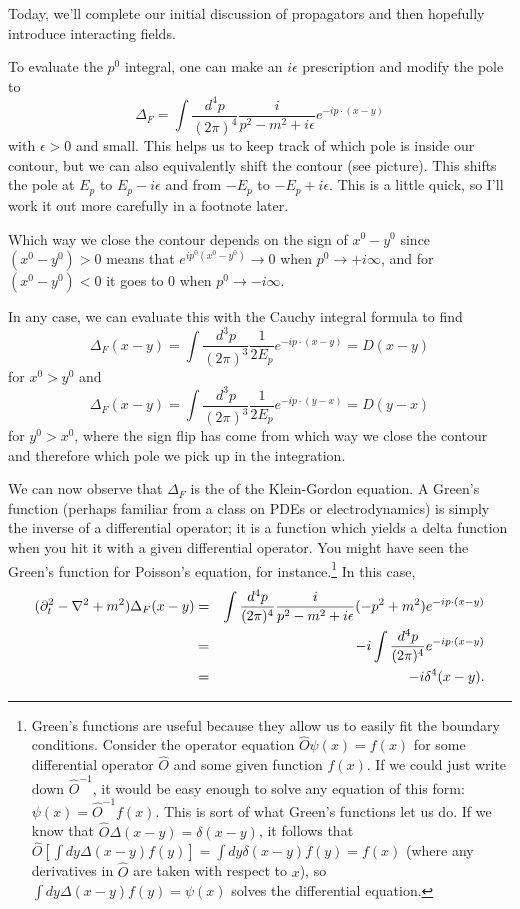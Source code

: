 Today, we'll complete our initial discussion of propagators and then hopefully introduce interacting fields.

To evaluate the $p^0$ integral, one can make an $i\epsilon$ prescription and modify the pole to
$$\Delta_F=\int \frac{d^4p}{(2\pi)^4}\frac{i}{p^2-m^2+i\epsilon}e^{-ip\cdot (x-y)}$$
with $\epsilon>0$ and small. This helps us to keep track of which pole is inside our contour, but we can also equivalently shift the contour (see picture). This shifts the pole at $E_p$ to $E_p-i\epsilon$ and from $-E_p$ to $-E_p+i\epsilon$. This is a little quick, so I'll work it out more carefully in a footnote later.

Which way we close the contour depends on the sign of $x^0-y^0$ since $(x^0-y^0)>0$ means that $e^{ip^0 (x^0-y^0)}\to 0$ when $p^0\to +i\infty$, and for $(x^0-y^0)<0$ it goes to $0$ when $p^0\to -i\infty$.

In any case, we can evaluate this with the Cauchy integral formula to find
$$\Delta_F(x-y)=\int \frac{d^3p}{(2\pi)^3}\frac{1}{2E_p}e^{-ip\cdot (x-y)}=D(x-y)$$
for $x^0>y^0$ and 
$$\Delta_F(x-y)=\int \frac{d^3p}{(2\pi)^3}\frac{1}{2E_p}e^{-ip\cdot (y-x)}=D(y-x)$$ for $y^0>x^0$, where the sign flip has come from which way we close the contour and therefore which pole we pick up in the integration.

We can now observe that $\Delta_F$ is the  of the Klein-Gordon equation. A Green's function (perhaps familiar from a class on PDEs or electrodynamics) is simply the inverse of a differential operator; it is a function which yields a delta function when you hit it with a given differential operator. You might have seen the Green's function for Poisson's equation, for instance.\footnote{Green's functions are useful because they allow us to easily fit the boundary conditions. Consider the operator equation $\hat O \psi(x) = f(x)$ for some differential operator $\hat O$ and some given function $f(x)$. If we could just write down $\hat O^{-1}$, it would be easy enough to solve any equation of this form: $\psi(x)=\hat O^{-1} f(x)$. This is sort of what Green's functions let us do. If we know that $\hat O \Delta(x-y) = \delta(x-y)$, it follows that $\hat O \left[\int dy \Delta(x-y) f(y)\right]=\int dy \delta(x-y) f(y) = f(x)$ (where any derivatives in $\hat O$ are taken with respect to $x$), so $\int dy \Delta(x-y)f(y)=\psi(x)$ solves the differential equation.} In this case,
\begin{eqnarray*}
(\partial_t^2 -\nabla^2+m^2)\Delta_F(x-y)&=& \int \frac{d^4p}{(2\pi)^4}\frac{i}{p^2-m^2+i\epsilon}(-p^2+m^2) e^{-ip\cdot (x-y)}\\
&=&-i\int \frac{d^4p}{(2\pi)^4} e^{-ip\cdot (x-y)}\\
&=& -i \delta^4 (x-y).
\end{eqnarray*}


